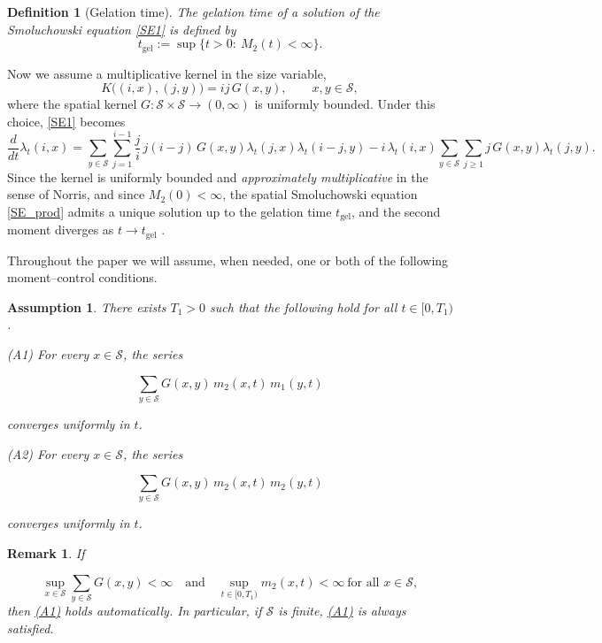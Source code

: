 \documentclass[12pt,twoside]{article}
\newtheorem{rem}[thm]{Remark}
\newtheorem{assumption}[thm]{Assumption}
\newtheorem{defn}[thm]{Definition}
\begin{document}
\begin{defn}[Gelation time]\label{def:tg}
The gelation time of a solution of the Smoluchowski equation \eqref{SE1} is defined by 
\begin{equation}\label{eq:def:tg}
t_{\mathrm{gel}} := \sup\{t>0:\ M_2(t)<\infty\}.
\end{equation}
\end{defn}
Now we assume a multiplicative kernel in the size variable,
\begin{equation}\label{kernel}
K\bigl((i,x),(j,y)\bigr)=ij\,G(x,y),
\qquad x,y\in\mathcal S,
\end{equation}
where the spatial kernel $G:\mathcal S\times\mathcal S\to(0,\infty)$ is
uniformly bounded. Under this choice, \eqref{SE1} becomes
\begin{equation}\label{SE_prod}
\frac{d}{dt}\lambda_t(i,x)=
\sum_{y\in\mathcal S}\sum_{j=1}^{i-1} \frac{j}{i}\,j(i-j)\,G(x,y) \lambda_t(j,x)\lambda_t(i-j,y)-i\,\lambda_t(i,x) \sum_{y\in\mathcal S}\sum_{j\ge1}
j\,G(x,y)\lambda_t(j,y).
\end{equation}
Since the kernel is uniformly bounded and \emph{approximately multiplicative} in the sense of
Norris, and since $M_2(0)<\infty$, the spatial Smoluchowski equation
\eqref{SE_prod} admits a unique solution up to the gelation time
$t_{\mathrm{gel}}$, and the second moment diverges as $t\to
t_{\mathrm{gel}}$ \cite[Theorem~2.2]{norris-cluster-coag}.

\medskip

Throughout the paper we will assume, when needed, one or both of the following
moment–control conditions.

\begin{assumption}\label{ass:moment-justification}
There exists $T_1>0$ such that the following hold for all $t\in[0,T_1)$.

\smallskip
\noindent\hypertarget{ass:A1}{\textnormal{(A1)}}  
For every $x\in\mathcal S$, the series


\[
\sum_{y\in\mathcal S} G(x,y)\,m_2(x,t)\,m_1(y,t)
\]


converges uniformly in $t$.

\smallskip
\noindent\hypertarget{ass:A2}{\textnormal{(A2)}}  
For every $x\in\mathcal S$, the series


\[
\sum_{y\in\mathcal S} G(x,y)\,m_2(x,t)\,m_2(y,t)
\]


converges uniformly in $t$.
\end{assumption}

\begin{rem}
If


\[
\sup_{x\in\mathcal S}\sum_{y\in\mathcal S}G(x,y)<\infty
\quad\text{and}\quad
\sup_{t\in[0,T_1)} m_2(x,t)<\infty
\ \text{for all }x\in\mathcal S,
\]
then \hyperlink{ass:A1}{(A1)} holds automatically.  
In particular, if $\mathcal S$ is finite, \hyperlink{ass:A1}{(A1)} is always satisfied.
\end{rem}
\end{document}
